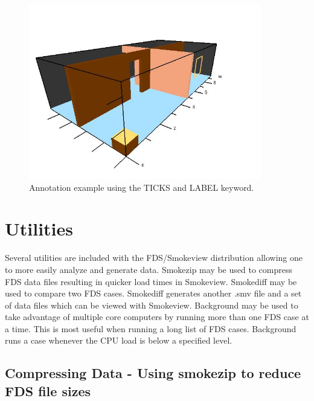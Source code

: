 \documentclass[11pt,twoside]{book}
\begin{document}
\begin{figure}[bph]
\begin{center}
\includegraphics[height=3.0in]{FIGURES/ticklabels}
\end{center}
\caption{ Annotation example using the TICKS and LABEL keyword. }
\label{figticklabelexample}%
\end{figure}

\chapter{Utilities}
Several utilities are included with the FDS/Smokeview distribution allowing one
to more easily analyze and generate data.  Smokezip may be used to compress
FDS data files resulting in quicker load times in Smokeview.  Smokediff may be used
to compare two FDS cases.  Smokediff generates another .smv file and a set of data files
which can be viewed with Smokeview.  Background may be used to take advantage of multiple
core computers by running more than one FDS case at a time.  This is most useful when running
a long list of FDS cases. Background runs a case whenever the CPU load is below a specified level.


\section{Compressing Data - Using smokezip to reduce FDS file sizes}
\label{ch:smokezip}
\end{document}
